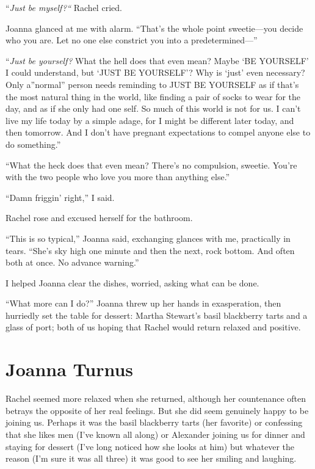 ``\emph{Just be myself?{}``} Rachel cried.

Joanna glanced at me with alarm. ``That's the whole point sweetie---you
decide who you are. Let no one else constrict you into a
predetermined---''

``\emph{Just be yourself?} What the hell does that even mean? Maybe `BE
YOURSELF' I could understand, but `JUST BE YOURSELF'? Why is `just' even
necessary? Only a''normal'' person needs reminding to JUST BE YOURSELF
as if that's the most natural thing in the world, like finding a pair of
socks to wear for the day, and as if she only had one self. So much of
this world is not for us. I can't live my life today by a simple adage,
for I might be different later today, and then tomorrow. And I don't
have pregnant expectations to compel anyone else to do something.''

``What the heck does that even mean? There's no compulsion, sweetie.
You're with the two people who love you more than anything else.''

``Damn friggin' right,'' I said.

Rachel rose and excused herself for the bathroom.

``This is so typical,'' Joanna said, exchanging glances with me,
practically in tears. ``She's sky high one minute and then the next,
rock bottom. And often both at once. No advance warning.''

I helped Joanna clear the dishes, worried, asking what can be done.

``What more can I do?'' Joanna threw up her hands in exasperation, then
hurriedly set the table for dessert: Martha Stewart's basil blackberry
tarts and a glass of port; both of us hoping that Rachel would return
relaxed and positive.

\chapter{Joanna Turnus}

\titlemark

Rachel seemed more relaxed when she returned, although her countenance
often betrays the opposite of her real feelings. But she did seem
genuinely happy to be joining us. Perhaps it was the basil blackberry
tarts (her favorite) or confessing that she likes men (I've known all
along) or Alexander joining us for dinner and staying for dessert (I've
long noticed how she looks at him) but whatever the reason (I'm sure it
was all three) it was good to see her smiling and laughing.

